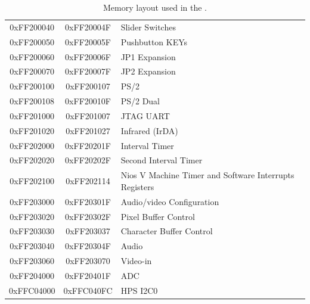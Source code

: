 \begin{table}[h]
\begin{center}
\begin{tabular}{c|c|l}
        \\
            0xFF200040
            & 0xFF20004F
            & Slider Switches
        \\
            0xFF200050
            & 0xFF20005F
            & Pushbutton KEYs
        \\
            0xFF200060
            & 0xFF20006F
            & JP1 Expansion
        \\
            0xFF200070
            & 0xFF20007F
            & JP2 Expansion
        \\
            0xFF200100
            & 0xFF200107
            & PS/2
        \\
            0xFF200108
            & 0xFF20010F
            & PS/2 Dual
        \\
            0xFF201000
            & 0xFF201007
            & JTAG UART
        \\
            0xFF201020
            & 0xFF201027
				& Infrared (IrDA)
        \\
            0xFF202000
            & 0xFF20201F
            & Interval Timer
        \\
            0xFF202020
            & 0xFF20202F
            & Second Interval Timer
        \\
            0xFF202100
            & 0xFF202114
            & Nios V Machine Timer and Software Interrupts Registers
        \\
            0xFF203000
            & 0xFF20301F
            & Audio/video Configuration
        \\
            0xFF203020
            & 0xFF20302F
            & Pixel Buffer Control
        \\
            0xFF203030
            & 0xFF203037
            & Character Buffer Control
        \\
            0xFF203040
            & 0xFF20304F
            & Audio
        \\
            0xFF203060
            & 0xFF203070
            & Video-in
        \\
            0xFF204000
            & 0xFF20401F
            & ADC
        \\
            0xFFC04000
            & 0xFFC040FC
            & HPS I2C0
        \\
    \end{tabular}
    \caption{Memory layout used in the \systemNameFull.}
    \label{tab:memorylayout}
    \end{center}
\end{table}

